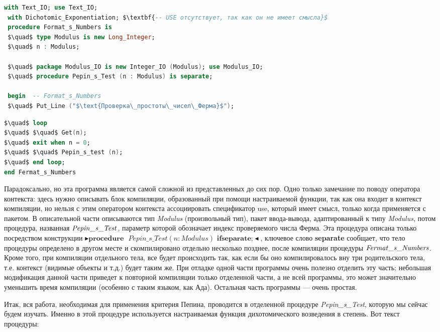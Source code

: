  \begin{lstlisting}[mathescape=true, language=Ada, basicstyle=\small]
 with Text_IO; use Text_IO;
 with Dichotomic_Exponentiation; $\textbf{-- USE отсутствует, так как он не имеет смысла}$
 procedure Format_s_Numbers is
 $\quad$ type Modulus is new Long_Integer;
 $\quad$ n : Modulus;
 
 $\quad$ package Modulus_IO is new Integer_IO (Modulus); use Modulus_IO;
 $\quad$ procedure Pepin_s_Test (n : Modulus) is separate;
 
 begin  -- Format_s_Numbers
 $\quad$ Put_Line ("$\text{Проверка\_простоты\_чисел\_Ферма}$");
 \end{lstlisting}
 
 \newpage

\begin{lstlisting}[mathescape=true, language=Ada, basicstyle=\small]
$\quad$ loop
$\quad$ $\quad$ Get(n);
$\quad$ exit when n = 0;
$\quad$ $\quad$ Pepin_s_test (n);
$\quad$ end loop;
end Fermat_s_Numbers
\end{lstlisting}
 
 \par Парадоксально, но эта программа является самой сложной из представленных до сих пор. Одно только замечание по поводу оператора контекста: здесь нужно описывать блок компиляции, образованный при помощи настраиваемой функции, так как она входит в контекст компи­ляции, но нельзя с этим оператором контекста ассоциировать специфи­катор use, который имеет смысл, только когда применяется с пакетом. В описательной части описываются тип {\it Modulus} (произвольный тип), пакет ввода-вывода, адаптированный к типу {\it Modulus}, потом процеду­ра, названная \linebreak ${\it Pepin\_ s\_ Test}$, параметр которой обозначает индекс проверяемого числа Ферма. \linebreak Эта процедура описана только посредством кон­струкции $\blacktriangleright \textbf{procedure }$ \newline $\textit{Pepin\_s\_Test} (n : Modulus) \textbf{ ifseparate;} \blacktriangleleft$, ключевое слово {\bf separate} сообщает, что тело процедуры определено в другом
месте и скомпилировано отдельно несколько позднее, после компиляции
процедуры ${\it Fermat\_ s\_ Numbers}$. Кроме того, при компиляции отдельного
тела, все будет происходить так, как если бы оно компилировалось вну­
три родительского тела, т.е. контекст (видимые объекты и т.д.) будет
таким же. При отладке одной части программы очень полезно отделить
эту часть; небольшая модификация данной части приведет к повторной
компиляции только отделенной части, а не всей программы, это может
значительно уменьшить время компиляции (особенно с таким языком,
как Ада). Остальная часть программы — очень простая.
\par Итак, вся работа, необходимая для применения критерия Пепина,
проводится в отделенной процедуре {\it Pepin\_s\_Test}, которую мы сейчас
будем изучать. Именно в этой процедуре используется настраиваемая
функция дихотомического возведения в степень. Вот текст процедуры:

